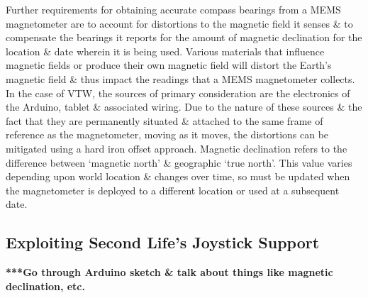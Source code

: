 Further requirements for obtaining accurate compass bearings from a MEMS magnetometer are to account for distortions to the magnetic field it senses \& to compensate the bearings it reports for the amount of magnetic declination for the location \& date wherein it is being used. Various materials that influence magnetic fields or produce their own magnetic field will distort the Earth's magnetic field \& thus impact the readings that a MEMS magnetometer collects. In the case of VTW, the sources of primary consideration are the electronics of the Arduino, tablet \& associated wiring. Due to the nature of these sources \& the fact that they are permanently situated \& attached to the same frame of reference as the magnetometer, moving as it moves, the distortions can be mitigated using a hard iron offset approach. Magnetic declination refers to the difference between `magnetic north' \& geographic `true north'. This value varies depending upon world location \& changes over time, so must be updated when the magnetometer is deployed to a different location or used at a subsequent date.



\subsection{Exploiting Second Life's Joystick Support}

\label{exploitJoystick}

\textbf{***Go through Arduino sketch \& talk about things like magnetic declination, etc.}

\newcommand{\ArduinoJoystickVideoFootnote}{\footnote{\url{https://www.youtube.com/watch?v=-ddtmqoGNmg}}}

\newcommand{\atmegaFootnote}{\footnote{\url{http://www.atmel.com/devices/ATMEGA16U2.aspx}}}

\newcommand{\atmegaTFootnote}{\footnote{\url{http://www.atmel.com/devices/atmega328.aspx}}}

\newcommand{\arduinousbhidFootnote}{\footnote{\url{http://hunt.net.nz/users/darran/weblog/a3599/}}}

\newcommand{\lufaFootnote}{\footnote{\url{http://www.fourwalledcubicle.com/LUFA.php}}}


